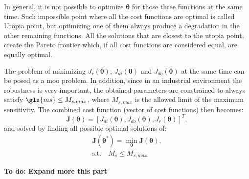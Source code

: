 In general, it is not possible to optimize $\bm{\theta}$ for those three functions at the same time. Such impossible point where all the cost functions are optimal is called Utopia point, but optimizing one of them always produce a degradation in the other remaining functions. All the solutions that are closest to the utopia point, create the Pareto frontier which, if all cost functions are considered equal, are equally optimal. 

The problem of minimizing $J_r(\bm{\theta})$, $J_{di}(\bm{\theta})$ and $J_{do}(\bm{\theta})$ at the same time can be posed as a \gls{moo} problem. In addition, since in an industrial environment the robustness is very important, the obtained parameters are constrained to always satisfy  $\gls{ms} \leq M_{s,max}$, where $M_{s,max}$ is the allowed limit of the maximum sensitivity. The combined cost function (vector of cost functions) then becomes:
%
\begin{equation}  %
\textbf{J}(\bm{\theta})=\left[J_{di}(\bm{\theta}), J_{do}(\bm{\theta}), J_{r}(\bm{\theta})\right]^T,
\label{eq:Jtotal}
\end{equation}
%
and solved by finding all possible optimal solutions of:
%
\begin{equation}  %
\begin{gathered}
\textbf{J}(\bm{\theta}^*) = \min_{\bm{\theta}} \textbf{J}(\bm{\theta}),\\
\text{s.t.} \quad  M_s \leq M_{s,max}
\end{gathered}
\label{eq:probmoo}
\end{equation}

\textbf{To do: Expand more this part}